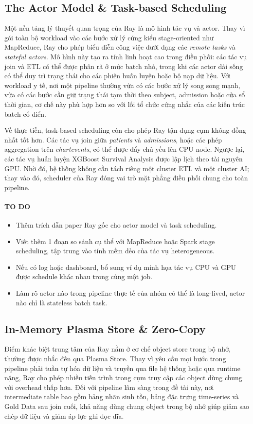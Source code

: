 \subsection{The Actor Model \& Task-based Scheduling}
Một nền tảng lý thuyết quan trọng của Ray là mô hình tác vụ và actor. Thay vì gói toàn bộ workload vào các bước xử lý cứng kiểu stage-oriented như MapReduce, Ray cho phép biểu diễn công việc dưới dạng các \textit{remote tasks} và \textit{stateful actors}. Mô hình này tạo ra tính linh hoạt cao trong điều phối: các tác vụ join và ETL có thể được phân rã ở mức batch nhỏ, trong khi các actor dài sống có thể duy trì trạng thái cho các phiên huấn luyện hoặc bộ nạp dữ liệu. Với workload y tế, nơi một pipeline thường vừa có các bước xử lý song song mạnh, vừa có các bước cần giữ trạng thái tạm thời theo subject, admission hoặc cửa sổ thời gian, cơ chế này phù hợp hơn so với lối tổ chức cứng nhắc của các kiến trúc batch cổ điển.

Về thực tiễn, task-based scheduling còn cho phép Ray tận dụng cụm không đồng nhất tốt hơn. Các tác vụ join giữa \textit{patients} và \textit{admissions}, hoặc các phép aggregation trên \textit{chartevents}, có thể được đẩy chủ yếu lên CPU node. Ngược lại, các tác vụ huấn luyện XGBoost Survival Analysis được lập lịch theo tài nguyên GPU. Nhờ đó, hệ thống không cần tách riêng một cluster ETL và một cluster AI; thay vào đó, scheduler của Ray đóng vai trò mặt phẳng điều phối chung cho toàn pipeline.

\paragraph{TO DO}
\begin{itemize}
    \item Thêm trích dẫn paper Ray gốc cho actor model và task scheduling.
    \item Viết thêm 1 đoạn so sánh cụ thể với MapReduce hoặc Spark stage scheduling, tập trung vào tính mềm dẻo của tác vụ heterogeneous.
    \item Nếu có log hoặc dashboard, bổ sung ví dụ minh họa tác vụ CPU và GPU được schedule khác nhau trong cùng một job.
    \item Làm rõ actor nào trong pipeline thực tế của nhóm có thể là long-lived, actor nào chỉ là stateless batch task.
\end{itemize}

\subsection{In-Memory Plasma Store \& Zero-Copy}
Điểm khác biệt trung tâm của Ray nằm ở cơ chế object store trong bộ nhớ, thường được nhắc đến qua Plasma Store. Thay vì yêu cầu mọi bước trong pipeline phải tuần tự hóa dữ liệu và truyền qua file hệ thống hoặc qua runtime nặng, Ray cho phép nhiều tiến trình trong cụm truy cập các object dùng chung với overhead thấp hơn. Đối với pipeline lâm sàng trong đề tài này, nơi intermediate table bao gồm bảng nhãn sinh tồn, bảng đặc trưng time-series và Gold Data sau join cuối, khả năng dùng chung object trong bộ nhớ giúp giảm sao chép dữ liệu và giảm áp lực ghi đọc đĩa.


